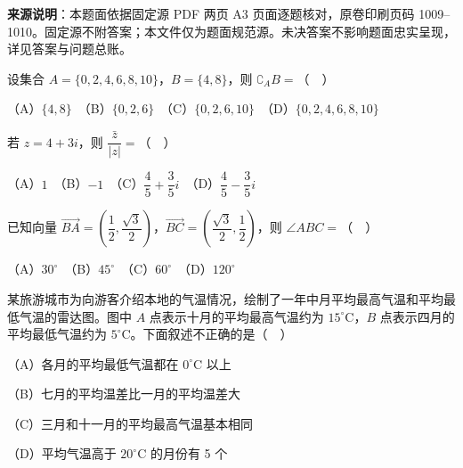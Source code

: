 


\begin{gktip}
\textbf{来源说明}：本题面依据固定源 PDF 两页 A3 页面逐题核对，原卷印刷页码 1009–1010。固定源不附答案；本文件仅为题面规范源。未决答案不影响题面忠实呈现，详见答案与问题总账。
\end{gktip}


\begin{question}
设集合 \(A=\{0,2,4,6,8,10\}\)，\(B=\{4,8\}\)，则 \(\complement_A B=\)（　）

（A）\(\{4,8\}\)　（B）\(\{0,2,6\}\)　（C）\(\{0,2,6,10\}\)　（D）\(\{0,2,4,6,8,10\}\)

\end{question}
\begin{question}
若 \(z=4+3i\)，则 \(\dfrac{\bar z}{|z|}=\)（　）

（A）\(1\)　（B）\(-1\)　（C）\(\dfrac45+\dfrac35i\)　（D）\(\dfrac45-\dfrac35i\)

\end{question}
\begin{question}
已知向量 \(\overrightarrow{BA}=\left(\dfrac12,\dfrac{\sqrt3}{2}\right)\)，\(\overrightarrow{BC}=\left(\dfrac{\sqrt3}{2},\dfrac12\right)\)，则 \(\angle ABC=\)（　）

（A）\(30^\circ\)　（B）\(45^\circ\)　（C）\(60^\circ\)　（D）\(120^\circ\)

\Needspace{0.4\textheight}
\end{question}
\begin{question}
某旅游城市为向游客介绍本地的气温情况，绘制了一年中月平均最高气温和平均最低气温的雷达图。图中 \(A\) 点表示十月的平均最高气温约为 \(15^\circ\mathrm C\)，\(B\) 点表示四月的平均最低气温约为 \(5^\circ\mathrm C\)。下面叙述不正确的是（　）
\nopagebreak[4]
\begin{center}\end{center}
\nopagebreak[4]
（A）各月的平均最低气温都在 \(0^\circ\mathrm C\) 以上

（B）七月的平均温差比一月的平均温差大

（C）三月和十一月的平均最高气温基本相同

（D）平均气温高于 \(20^\circ\mathrm C\) 的月份有 5 个

\end{question}
